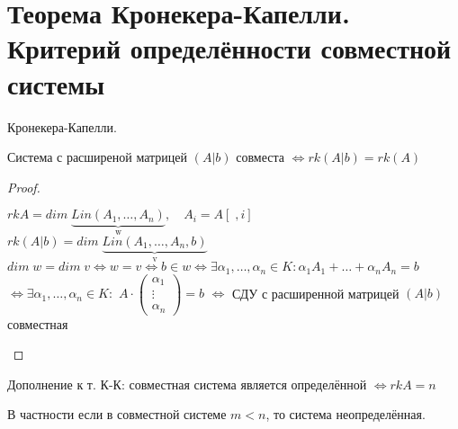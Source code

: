 \section{Теорема Кронекера-Капелли. Критерий определённости совместной системы}

\begin{theorem}
    Кронекера-Капелли.

    Система с расширеной матрицей $(A|b)$ совместа
    $\Longleftrightarrow rk(A|b) = rk(A)$

    \begin{proof}
        \begin{center}
            $rkA = dim \; \underbrace{Lin(A_1, \dots, A_n)}_{\text{w}}, \quad A_i = A[ \; , i]$ \\
            $rk(A | b) = dim \; \underbrace{Lin(A_1, \dots, A_n, b)}_{\text{v}}$ \\
            $dim \; w = dim \; v \Longleftrightarrow w = v \Longleftrightarrow b \in w
            \Longleftrightarrow \exists \alpha_1, \dots, \alpha_n \in K:
            \alpha_1 A_1 + \dots + \alpha_n A_n = b$ \\
            $\Longleftrightarrow \exists \alpha_1, \dots, \alpha_n \in K:$ 
            $A \cdot \begin{pmatrix}
                \alpha_1 \\
                \vdots \\
                \alpha_n
            \end{pmatrix} = b$ $\Longleftrightarrow$ СДУ с расширенной матрицей $(A | b)$ совместная
        \end{center}    
    \end{proof}
\end{theorem}

\notice Дополнение к т. К-К: совместная система является определённой $\Longleftrightarrow rkA = n$ 

В частности если в совместной системе $m < n$, то система неопределённая.